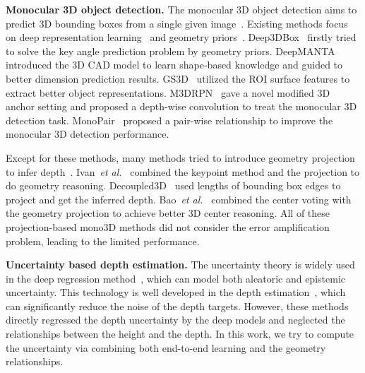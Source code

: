 \documentclass[10pt,twocolumn,letterpaper]{article}
\begin{document}
\noindent 
\textbf{Monocular 3D object detection.} The monocular 3D object detection aims to predict 3D bounding boxes from a single given image~\cite{ding2020learning,he2019mono3d++,kundu20183d,liu2019deep,manhardt2019roi,simonelli2019disentangling}. 
Existing methods focus on deep representation learning~\cite{roddick2018orthographic} and geometry priors~\cite{ma2020rethinking,ma2019accurate,wang2019pseudo,ma2021delving}. Deep3DBox~\cite{mousavian20173d} firstly tried to solve the key angle prediction problem by geometry priors.  DeepMANTA~\cite{chabot2017deep} introduced the 3D CAD model to learn shape-based knowledge and guided to better dimension prediction results.  GS3D~\cite{li2019gs3d} utilized the ROI surface features to extract better object representations.  M3DRPN~\cite{brazil2019m3d} gave a novel modified 3D anchor setting and proposed a depth-wise convolution to treat the monocular 3D detection task.  MonoPair~\cite{chen2020monopair} proposed a pair-wise relationship to improve the monocular 3D detection performance.

Except for these methods, many methods tried to introduce geometry projection to infer depth~\cite{bao2020object,barabanau2019monocular,cai2020monocular,ku2019monocular}. Ivan~\emph{et al.}~\cite{barabanau2019monocular} combined the keypoint method and the projection to do geometry reasoning.  Decoupled3D~\cite{cai2020monocular} used lengths of bounding box edges to project and get the inferred depth. Bao~\emph{et al.}~\cite{bao2020object} combined the center voting with the geometry projection to achieve better 3D center reasoning. All of these projection-based mono3D methods did not consider the error amplification problem, leading to the limited performance. 

\noindent 
\textbf{Uncertainty based depth estimation.} The uncertainty theory is widely used in the deep regression method~\cite{blundell2015weight}, which can model both aleatoric and epistemic uncertainty. This technology is well developed in the depth estimation~\cite{kendall2017uncertainties,liu2019neural}, which can significantly reduce the noise of the depth targets. However, these methods directly regressed the depth uncertainty by the deep models and neglected the relationships between the height and the depth. In this work, we try to compute the uncertainty via combining both end-to-end learning and the geometry relationships.
\end{document}
